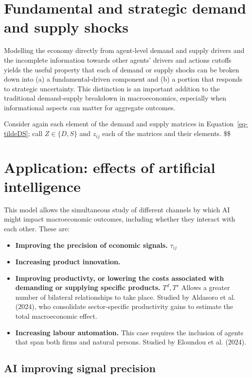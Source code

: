 \documentclass[
]{article}
\theoremstyle{plain}
\theoremstyle{definition}
\theoremstyle{remark}
\begin{document}
\section{Fundamental and strategic demand and supply
shocks}\label{fundamental-and-strategic-demand-and-supply-shocks}

Modelling the economy directly from agent-level demand and supply
drivers and the incomplete information towards other agents' drivers and
actions cutoffs yields the useful property that each of demand or supply
shocks can be broken down into (a) a fundamental-driven component and
(b) a portion that responds to strategic uncertainty. This distinction
is an important addition to the traditional demand-supply breakdown in
macroeconomics, especially when informational aspects can matter for
aggregate outcomes.

Consider again each element of the demand and supply matrices in
Equation~\ref{eq-tildeDS}; call \(Z \in \{D, S\}\) and \(z_{ij}\) each
of the matrices and their elements. \$\$

\section{Application: effects of artificial intelligence}\label{sec-AI}

This model allows the simultaneous study of different channels by which
AI might impact macroeconomic outcomes, including whether they interact
with each other. These are:

\begin{itemize}
\item
  \textbf{Improving the precision of economic signals.} \(\tau_{ij}\)
\item
  \textbf{Increasing product innovation.}
\item
  \textbf{Improving productivty, or lowering the costs associated with
  demanding or supplying specific products.} \(T^d, T^s\) Allows a
  greater number of bilateral relationships to take place. Studied by
  Aldasoro et al. (2024), who consolidate sector-specific productivity
  gains to estimate the total macroeconomic effect.
\item
  \textbf{Increasing labour automation.} This case requires the
  inclusion of agents that span both firms and natural persons. Studied
  by Eloundou et al. (2024).
\end{itemize}

\subsection{AI improving signal
precision}\label{ai-improving-signal-precision}
\end{document}
